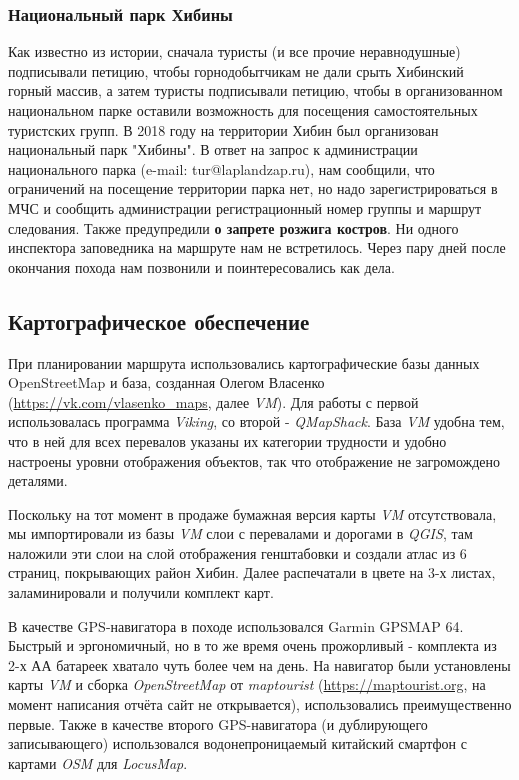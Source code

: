 \subsubsection{Национальный парк Хибины}
Как известно из истории, сначала туристы (и все прочие неравнодушные) подписывали петицию,
чтобы горнодобытчикам не дали срыть Хибинский горный массив, а затем туристы подписывали петицию,
чтобы в организованном национальном парке оставили возможность для посещения самостоятельных туристских групп.
В 2018 году на территории Хибин был организован национальный парк "Хибины".
В ответ на запрос к администрации национального парка (e-mail: tur@laplandzap.ru), нам сообщили,
что ограничений на посещение территории парка нет, но надо зарегистрироваться в МЧС
и сообщить администрации регистрационный номер группы и маршрут следования.
Также предупредили \textbf{\color{red}о запрете розжига костров}. Ни одного инспектора заповедника на маршруте нам не встретилось.
Через пару дней после окончания похода нам позвонили и поинтересовались как дела.

\subsection{Картографическое обеспечение}
При планировании маршрута использовались картографические базы данных OpenStreetMap и база,
созданная Олегом Власенко (\url{https://vk.com/vlasenko_maps}, далее \textit{VM}).
Для работы с первой использовалась программа \textit{Viking},
со второй - \textit{QMapShack}. База \textit{VM} удобна тем, что в ней для всех перевалов указаны их категории трудности
и удобно настроены уровни отображения объектов, так что отображение не загромождено деталями.

Поскольку на тот момент в продаже бумажная версия карты \textit{VM} отсутствовала,
мы импортировали из базы \textit{VM} слои с перевалами и дорогами в \textit{QGIS},
там наложили эти слои на слой отображения генштабовки и создали атлас из 6 страниц,
покрывающих район Хибин. Далее распечатали в цвете на 3-х листах, заламинировали и получили комплект карт.

В качестве GPS-навигатора в походе использовался Garmin GPSMAP 64.
Быстрый и эргономичный, но в то же время очень прожорливый - комплекта из 2-х АА батареек хватало чуть более чем на день.
На навигатор были установлены карты \textit{VM} и сборка \textit{OpenStreetMap}
от \textit{maptourist} (\url{https://maptourist.org}, на момент написания отчёта сайт не открывается),
использовались преимущественно первые. Также в качестве второго GPS-навигатора (и дублирующего записывающего)
использовался водонепроницаемый китайский смартфон с картами \textit{OSM} для \textit{LocusMap}.

